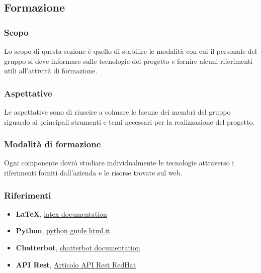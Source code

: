 \subsection{Formazione}
\subsubsection{Scopo}
Lo scopo di questa sezione è quello di stabilire le modalità con cui il personale del gruppo si deve informare sulle
tecnologie del progetto e fornire alcuni riferimenti utili all'attività di formazione.

\subsubsection{Aspettative}
Le aspettative sono di riuscire a colmare le lacune dei membri del gruppo riguardo ai
principali strumenti e temi necessari per la realizzazione del progetto.

\subsubsection{Modalità di formazione}
Ogni componente dovrà studiare individualmente le tecnologie attraverso i riferimenti forniti dall'azienda e
le risorse trovate sul web.

\subsubsection{Riferimenti}
\begin{itemize}
    \item \textbf{\LaTeX}, \href{https://www.latex-project.org/help/}{latex documentation}
    \item \textbf{Python}, \href{https://www.html.it/guide/guida-python/}{python guide html.it}
    \item \textbf{Chatterbot}, \href{https://chatterbot.readthedocs.io/en/stable/}{chatterbot documentation}
    \item \textbf{API Rest}, \href{https://www.redhat.com/it/topics/api/what-is-a-rest-api}{Articolo API Rest RedHat}
\end{itemize}